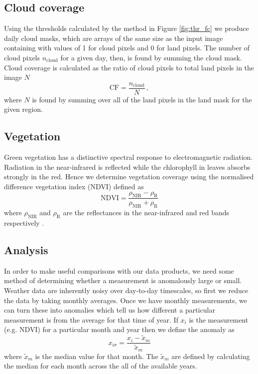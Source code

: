 \subsection{Cloud coverage}
Using the thresholds calculated by the method in Figure \ref{fig:thr_fc} we
produce daily cloud masks, which are arrays of the same size as the input image
containing with values of 1 for cloud pixels and 0 for land pixels. The number
of cloud pixels $n_{\mathrm{cloud}}$ for a given day, then, is found by summing
the cloud mask. Cloud coverage is calculated as the ratio of cloud pixels to
total land pixels in the image $N$
\begin{equation}
  \mathrm{CF} = \frac{n_{\mathrm{cloud}}}{N} \,,
  \label{eq:cloud_frac}
\end{equation}
where $N$ is found by summing over all of the land pixels in the land mask for
the given region.

\subsection{Vegetation}
Green vegetation has a distinctive spectral response to electromagnetic
radiation. Radiation in the near-infrared is reflected while the chlorophyll in
leaves absorbs strongly in the red. Hence we determine vegetation coverage using
the normalised difference vegetation index (NDVI) defined as
\begin{equation}
  \mathrm{NDVI} = \frac{\rho_{\mathrm{NIR}}-\rho_{\mathrm{R}}}{\rho_{\mathrm{NIR}}+\rho_{\mathrm{R}}}
  \label{eq:ndvi}
\end{equation}
where $\rho_{\mathrm{NIR}}$ and $\rho_{\mathrm{R}}$ are the reflectances in the
near-infrared and red bands respectively \citep{tucker1979}.

\subsection{Analysis}
In order to make useful comparisons with our data products, we need some method
of determining whether a measurement is anomalously large or small. Weather data
are inherently noisy over day-to-day timescales, so first we reduce the data by
taking monthly averages. Once we have monthly measurements, we can turn these
into anomalies which tell us how different a particular measurement is from the
average for that time of year. If $x_{i}$ is the measurement (e.g. NDVI) for a
particular month and year then we define the anomaly as
\begin{equation}
  x_{i\sigma}=\frac{x_{i}-\tilde{x}_m}{\tilde{x}_m}
  \label{eq:anoms}
\end{equation}
where $\tilde{x}_m$ is the median value for that month. The $\tilde{x}_m$ are
defined by calculating the median for each month across the all of the available
years.


